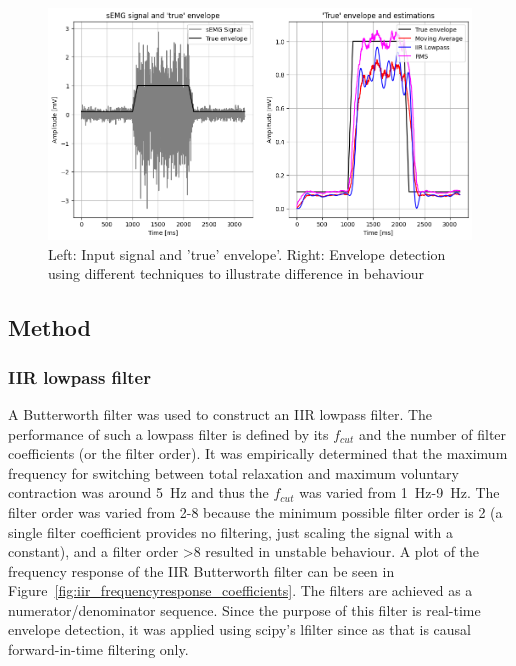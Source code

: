 \begin{figure}[h!t]
	\begin{center}
		\includegraphics[width=1.0\columnwidth]{images/envelope_detection.png}
	\end{center}
	\caption{Left: Input signal and 'true' envelope'. Right: Envelope detection using different techniques to illustrate difference in behaviour}
	\label{fig:envelope_detection}
\end{figure}

\subsection{Method}
\subsubsection{IIR lowpass filter}
A Butterworth filter was used to construct an IIR lowpass filter. The performance of such a lowpass filter is defined by its $f_{cut}$ and the number of filter coefficients (or the filter order). It was empirically determined that the maximum frequency for switching between total relaxation and maximum voluntary contraction was around \SI{5}{\hertz} and thus the $f_{cut}$ was varied from \SI{1}{\hertz}-\SI{9}{\hertz}. The filter order was varied from 2-8 because the minimum possible filter order is 2 (a single filter coefficient provides no filtering, just scaling the signal with a constant), and a filter order >8 resulted in unstable behaviour. A plot of the frequency response of the IIR Butterworth filter can be seen in Figure~\ref{fig:iir_frequencyresponse_coefficients}. The filters are achieved as a numerator/denominator sequence. Since the purpose of this filter is real-time envelope detection, it was applied using scipy's lfilter since as that is causal forward-in-time filtering only.


